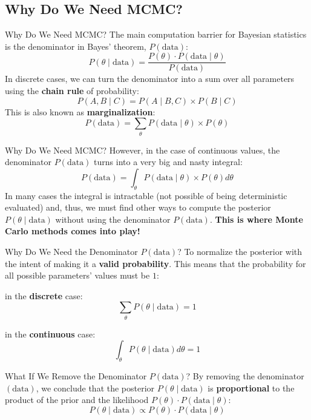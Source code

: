 \subsection{Why Do We Need MCMC?}
\begin{frame}{Why Do We Need MCMC?}
	The main computation barrier for Bayesian statistics is the denominator in Bayes' theorem,
	$P(\text{data})$:
	$$
		P(\theta \mid \text{data})=\frac{P(\theta) \cdot P(\text{data} \mid \theta)}{P(\text{data})}
	$$
	In discrete cases, we can turn the denominator into a sum over all parameters
	using the \textbf{chain rule} of probability:
	$$
		P(A,B \mid C)=P(A \mid B,C) \times P(B \mid C)
	$$
	This is also known as \textbf{marginalization}:
	$$
		P(\text{data})=\sum_{\theta} P(\text{data} \mid \theta) \times P(\theta)
	$$
\end{frame}

\begin{frame}{Why Do We Need MCMC?}
	However, in the case of continuous values,
	the denominator $P(\text{data})$
	turns into a very big and nasty integral:
	$$
		P(\text{data})=\int_{\theta} P(\text{data} \mid \theta) \times P(\theta)d \theta
	$$
	In many cases the integral is intractable
	(not possible of being deterministic evaluated) and,
	thus, we must find other ways to compute the posterior
	$P(\theta \mid \text{data})$ without using the denominator
	$P(\text{data})$.
	\vfill
	\Large \textbf{This is where Monte Carlo methods comes into play!}
\end{frame}

\begin{frame}{Why Do We Need the Denominator $P(\text{data})$?}
	To normalize the posterior with the intent of making it a \textbf{valid probability}.
	This means that the probability for all possible parameters' values must be $1$:
	\begin{vfilleditems}
		\item in the \textbf{discrete} case:
		$$
			\sum_{\theta} P(\theta \mid \text{data}) = 1
		$$
		\item in the \textbf{continuous} case:
		$$
			\int_{\theta} P(\theta \mid \text{data})d \theta = 1
		$$
	\end{vfilleditems}
\end{frame}

\begin{frame}{What If We Remove the Denominator $P(\text{data})$?}
	By removing the denominator $(\text{data})$,
	we conclude that the posterior
	$P(\theta \mid \text{data})$ is \textbf{proportional} to the
	product of the prior and the likelihood
	$P(\theta) \cdot P(\text{data} \mid \theta)$:
	$$
		P(\theta \mid \text{data}) \propto P(\theta) \cdot P(\text{data} \mid \theta)
	$$
\end{frame}


